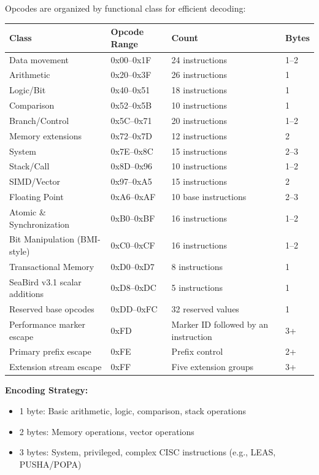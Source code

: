 \documentclass[11pt]{article}
\begin{document}
Opcodes are organized by functional class for efficient decoding:

\begin{table}[h]
\centering
\begin{tabular}{@{}L{3.2cm}L{2.5cm}L{4.5cm}L{1.5cm}@{}}
\toprule
\textbf{Class} & \textbf{Opcode Range} & \textbf{Count} & \textbf{Bytes} \\ \midrule
Data movement & 0x00--0x1F & 24 instructions & 1--2 \\
Arithmetic & 0x20--0x3F & 26 instructions & 1 \\
Logic/Bit & 0x40--0x51 & 18 instructions & 1 \\
Comparison & 0x52--0x5B & 10 instructions & 1 \\
Branch/Control & 0x5C--0x71 & 20 instructions & 1--2 \\
Memory extensions & 0x72--0x7D & 12 instructions & 2 \\
System & 0x7E--0x8C & 15 instructions & 2--3 \\
Stack/Call & 0x8D--0x96 & 10 instructions & 1--2 \\
SIMD/Vector & 0x97--0xA5 & 15 instructions & 2 \\
Floating Point & 0xA6--0xAF & 10 base instructions & 2--3 \\
Atomic \& Synchronization & 0xB0--0xBF & 16 instructions & 1--2 \\
Bit Manipulation (BMI-style) & 0xC0--0xCF & 16 instructions & 1--2 \\
Transactional Memory & 0xD0--0xD7 & 8 instructions & 1 \\
SeaBird v3.1 scalar additions & 0xD8--0xDC & 5 instructions & 1 \\
Reserved base opcodes & 0xDD--0xFC & 32 reserved values & 1 \\
Performance marker escape & 0xFD & Marker ID followed by an instruction & 3+ \\
Primary prefix escape & 0xFE & Prefix control & 2+ \\
Extension stream escape & 0xFF & Five extension groups & 3+ \\\bottomrule
\end{tabular}
\end{table}

\textbf{Encoding Strategy:}
\begin{itemize}
    \item 1 byte: Basic arithmetic, logic, comparison, stack operations
    \item 2 bytes: Memory operations, vector operations
    \item 3 bytes: System, privileged, complex CISC instructions (e.g., LEAS, PUSHA/POPA)
\end{itemize}
\end{document}
